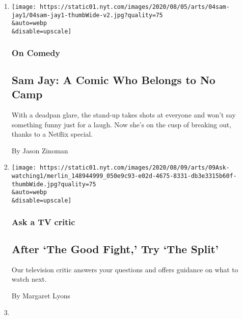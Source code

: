 \begin{enumerate}
\def\labelenumi{\arabic{enumi}.}
\item
  \href{/2020/08/04/arts/television/sam-jay-netflix-special.html}{}

  \texttt{[image: https://static01.nyt.com/images/2020/08/05/arts/04sam-jay1/04sam-jay1-thumbWide-v2.jpg?quality=75\\\&auto=webp\\\&disable=upscale]}

  \hypertarget{on-comedy}{%
  \subsubsection{On Comedy}\label{on-comedy}}

  \hypertarget{sam-jay-a-comic-who-belongs-to-no-camp}{%
  \subsection{Sam Jay: A Comic Who Belongs to No
  Camp}\label{sam-jay-a-comic-who-belongs-to-no-camp}}

  With a deadpan glare, the stand-up takes shots at everyone and won't
  say something funny just for a laugh. Now she's on the cusp of
  breaking out, thanks to a Netflix special.

  By Jason Zinoman
\item
  \href{/2020/08/04/arts/television/the-good-fight-the-split.html}{}

  \texttt{[image: https://static01.nyt.com/images/2020/08/09/arts/09Ask-watching1/merlin\_148944999\_050e9c93-e02d-4675-8331-db3e3315b60f-thumbWide.jpg?quality=75\\\&auto=webp\\\&disable=upscale]}

  \hypertarget{ask-a-tv-critic}{%
  \subsubsection{Ask a TV critic}\label{ask-a-tv-critic}}

  \hypertarget{after-the-good-fight-try-the-split}{%
  \subsection{After `The Good Fight,' Try `The
  Split'}\label{after-the-good-fight-try-the-split}}

  Our television critic answers your questions and offers guidance on
  what to watch next.

  By Margaret Lyons
\item
  \href{/2020/08/04/realestate/harris-faulkner-home-fox-news.html}{}


\end{enumerate}
